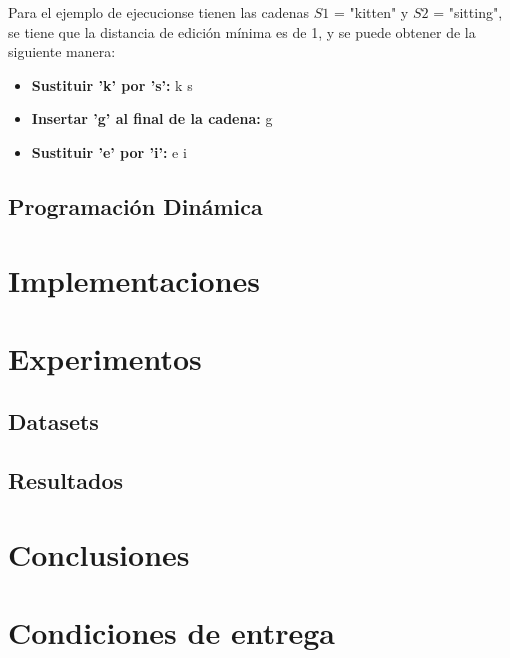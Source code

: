 \documentclass[11pt,spanish]{article}
\begin{document}
Para el ejemplo de ejecucionse tienen las cadenas $S1$ = "kitten" y $S2$ = "sitting", se tiene que la distancia de edición mínima es de 1,
y se puede obtener de la siguiente manera:

\begin{itemize}
    \item \textbf{Sustituir 'k' por 's':} k \textrightarrow s
    \item \textbf{Insertar 'g' al final de la cadena:} \textrightarrow g
    \item \textbf{Sustituir 'e' por 'i':} e \textrightarrow i
    
\end{itemize}


\subsection{Programación Dinámica}




\newpage
\section{Implementaciones}


\newpage
\section{Experimentos}

\subsection{Datasets}


\subsection{Resultados}


\newpage
\section{Conclusiones}


\newpage

\section{Condiciones de entrega}


\newpage
\appendix




\printbibliography
\end{document}
